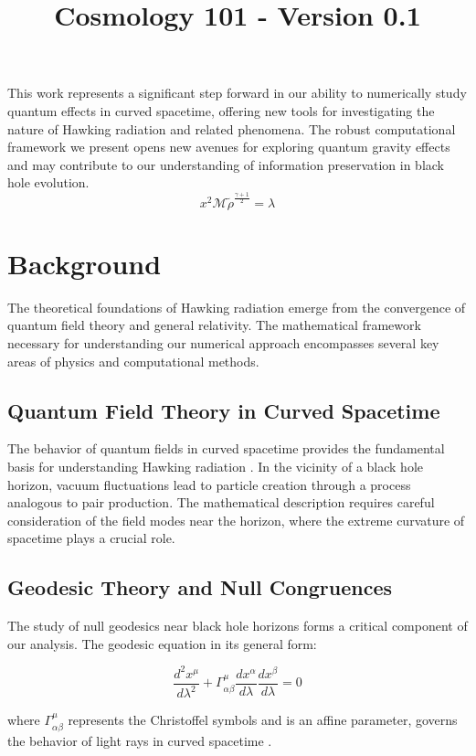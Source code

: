 \documentclass{article}\usepackage{graphicx} \usepackage{amsmath} \usepackage{colortbl}\title{Cosmology 101 - Version 0.1}
\begin{document}
This work represents a significant step forward in our ability to numerically study quantum effects in curved spacetime, offering new tools for investigating the nature of Hawking radiation and related phenomena. The robust computational framework we present opens new avenues for exploring quantum gravity effects and may contribute to our understanding of information preservation in black hole evolution.
 \begin{equation}x^2 \mathcal{M} \tilde{\rho }^{\frac{\gamma +1}{2}}=\lambda \label{Mi ecuacion 8} \end{equation}\section{Background}

The theoretical foundations of Hawking radiation emerge from the convergence of quantum field theory and general relativity. The mathematical framework necessary for understanding our numerical approach encompasses several key areas of physics and computational methods.

\subsection{Quantum Field Theory in Curved Spacetime}
The behavior of quantum fields in curved spacetime provides the fundamental basis for understanding Hawking radiation \cite{hawking1975}. In the vicinity of a black hole horizon, vacuum fluctuations lead to particle creation through a process analogous to pair production. The mathematical description requires careful consideration of the field modes near the horizon, where the extreme curvature of spacetime plays a crucial role.

\subsection{Geodesic Theory and Null Congruences}
The study of null geodesics near black hole horizons forms a critical component of our analysis. The geodesic equation in its general form:

\begin{equation}
\frac{d^2x^\mu}{d\lambda^2} + \Gamma^\mu_{\alpha\beta}\frac{dx^\alpha}{d\lambda}\frac{dx^\beta}{d\lambda} = 0
\end{equation}

where $\Gamma^\mu_{\alpha\beta}$ represents the Christoffel symbols and \lambda is an affine parameter, governs the behavior of light rays in curved spacetime \cite{parker1969}.
\end{document}
